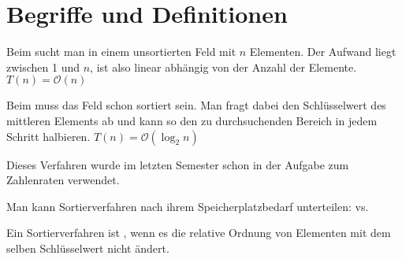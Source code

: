 \section{Begriffe und Definitionen}

Beim  sucht man in einem unsortierten Feld mit $n$ Elementen. Der Aufwand liegt zwischen 1 und $n$, ist also linear abhängig von der Anzahl der Elemente. $T(n)=\mathcal{O}(n)$

Beim  muss das Feld schon sortiert sein. Man fragt dabei den Schlüsselwert des mittleren Elements ab und kann so den zu durchsuchenden Bereich in jedem Schritt halbieren. $T(n)=\mathcal{O}(\log_2 n)$

\begin{*anmerkung}
	Dieses Verfahren wurde im letzten Semester schon in der Aufgabe zum Zahlenraten verwendet.
\end{*anmerkung}

Man kann Sortierverfahren nach ihrem Speicherplatzbedarf unterteilen:  vs. 

Ein Sortierverfahren ist , wenn es die relative Ordnung von Elementen mit dem selben Schlüsselwert nicht ändert.

